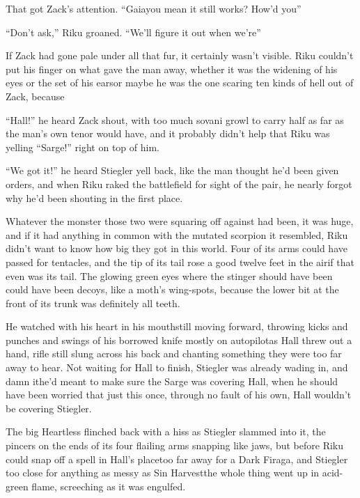 That got Zack's attention. ``Gaia\textemdash you mean it still works? How'd you\textemdash ''

``Don't ask,'' Riku groaned. ``We'll figure it out when we're\textemdash ''

If Zack had gone pale under all that fur, it certainly wasn't visible. Riku couldn't put his finger on what gave the man away, whether it was the widening of his eyes or the set of his ears\textemdash or maybe he was the one scaring ten kinds of hell out of Zack, because\textemdash 

``Hall!'' he heard Zack shout, with too much sovani growl to carry half as far as the man's own tenor would have, and it probably didn't help that Riku was yelling ``Sarge!'' right on top of him.

``We got it!'' he heard Stiegler yell back, like the man thought he'd been given orders, and when Riku raked the battlefield for sight of the pair, he nearly forgot why he'd been shouting in the first place.

Whatever the monster those two were squaring off against had been, it was huge, and if it had anything in common with the mutated scorpion it resembled, Riku didn't want to know how big they got in this world. Four of its arms could have passed for tentacles, and the tip of its tail rose a good twelve feet in the air\textemdash if that even was its tail. The glowing green eyes where the stinger should have been could have been decoys, like a moth's wing-spots, because the lower bit at the front of its trunk was definitely all teeth.

He watched with his heart in his mouth\textemdash still moving forward, throwing kicks and punches and swings of his borrowed knife mostly on autopilot\textemdash as Hall threw out a hand, rifle still slung across his back and chanting something they were too far away to hear. Not waiting for Hall to finish, Stiegler was already wading in, and damn it\textemdash he'd meant to make sure the Sarge was covering Hall, when he should have been worried that just this once, through no fault of his own, Hall wouldn't be covering Stiegler.

The big Heartless flinched back with a hiss as Stiegler slammed into it, the pincers on the ends of its four flailing arms snapping like jaws, but before Riku could snap off a spell in Hall's place\textemdash too far away for a Dark Firaga, and Stiegler too close for anything as messy as Sin Harvest\textemdash the whole thing went up in acid-green flame, screeching as it was engulfed.

